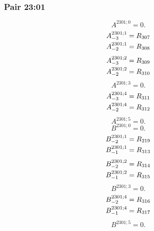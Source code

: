 \documentclass[11pt,a4paper]{article}
\begin{document}
\subsubsection{Pair 23:01}
\begin{equation}
A^{2301;0}=0.
\label{eq:cat-map-390}
\end{equation}
\begin{equation}
\shortstack[l]{$\displaystyle A^{2301;1}_{-3}=R_{307}$\\
$\displaystyle A^{2301;1}_{-2}=R_{308}$}
\label{eq:cat-map-391}
\end{equation}
\begin{equation}
\shortstack[l]{$\displaystyle A^{2301;2}_{-3}=R_{309}$\\
$\displaystyle A^{2301;2}_{-2}=R_{310}$}
\label{eq:cat-map-392}
\end{equation}
\begin{equation}
A^{2301;3}=0.
\label{eq:cat-map-393}
\end{equation}
\begin{equation}
\shortstack[l]{$\displaystyle A^{2301;4}_{-3}=R_{311}$\\
$\displaystyle A^{2301;4}_{-2}=R_{312}$}
\label{eq:cat-map-394}
\end{equation}
\begin{equation}
A^{2301;5}=0.
\label{eq:cat-map-395}
\end{equation}
\begin{equation}
B^{2301;0}=0.
\label{eq:cat-map-396}
\end{equation}
\begin{equation}
\shortstack[l]{$\displaystyle B^{2301;1}_{-2}=R_{219}$\\
$\displaystyle B^{2301;1}_{-1}=R_{313}$}
\label{eq:cat-map-397}
\end{equation}
\begin{equation}
\shortstack[l]{$\displaystyle B^{2301;2}_{-2}=R_{314}$\\
$\displaystyle B^{2301;2}_{-1}=R_{315}$}
\label{eq:cat-map-398}
\end{equation}
\begin{equation}
B^{2301;3}=0.
\label{eq:cat-map-399}
\end{equation}
\begin{equation}
\shortstack[l]{$\displaystyle B^{2301;4}_{-2}=R_{316}$\\
$\displaystyle B^{2301;4}_{-1}=R_{317}$}
\label{eq:cat-map-400}
\end{equation}
\begin{equation}
B^{2301;5}=0.
\label{eq:cat-map-401}
\end{equation}
\end{document}
